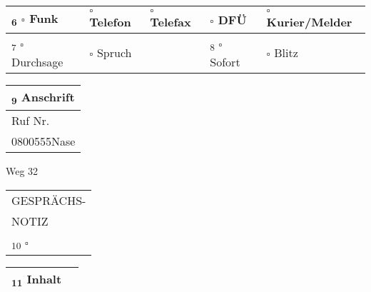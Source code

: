 \documentclass[a5paper]{article}
\def \uncheckedbox{$\square$ }
\def \formMidRadio{\uncheckedbox}
\def \formMidPhone{\uncheckedbox}
\def \formMidFax{\uncheckedbox}
\def \formMidDFU{\uncheckedbox}
\def \formMidCourier{\uncheckedbox}
\def \formCallAnouncement{\uncheckedbox}
\def \formCallMessage{\uncheckedbox}
\def \formPriorityInstant{\uncheckedbox}
\def \formPriorityFlash{\uncheckedbox}
\def \formCallNumber{0800555Nase}
\def \formAddress{Weg 32}
\def \formTalkNote{\uncheckedbox}
\begin{document}
{\begin{minipage}{\textwidth}
\begin{tabularx}{0.982\textwidth}{|l|X|}
\hline
\end{tabularx}
\vspace{-1.2pt}
\end{minipage}
\begin{minipage}{\textwidth}
\begin{tabularx}{0.982\textwidth}{|X X X X X|}
\textsubscript{6} \formMidRadio Funk & \formMidPhone Telefon & \formMidFax Telefax &  \hspace{8pt}\formMidDFU DFÜ &  \formMidCourier Kurier/Melder\\
\hline
\textsubscript{7} \formCallAnouncement Durchsage & \formCallMessage Spruch &   & \textsubscript{8} \formPriorityInstant Sofort &  \formPriorityFlash Blitz\\
\hline
\end{tabularx}
\vspace{-1pt}
\end{minipage}
\begin{minipage}{\textwidth}
\begin{minipage}{0.2\textwidth}
\renewcommand{\arraystretch}{1}
\begin{tabularx}{\textwidth}{|X|}
\textsubscript{9} Anschrift\\
\hline
\hspace{7.8pt}Ruf Nr.\\
\hspace{7.8pt}\formCallNumber
\end{tabularx}
\end{minipage}
\begin{minipage}{0.5755\textwidth}
\formAddress
\end{minipage}
\begin{minipage}{0.1849\textwidth}
\begin{tabularx}{\textwidth}{|X|}
\centering	GESPRÄCHS- \tabularnewline
\centering	NOTIZ \tabularnewline
\hline
\textsubscript{10} \hspace{15pt} \formTalkNote 
\end{tabularx}
\end{minipage}
\vspace{-1.5pt}
\end{minipage}
\begin{minipage}{\textwidth}
\begin{tabularx}{0.982\textwidth}{|p{72.7pt}|X|}
\hline
\textsubscript{11} Inhalt & \\
\hline
\end{tabularx}
\vspace{-1.5pt}
\end{minipage}
}
\end{document}
